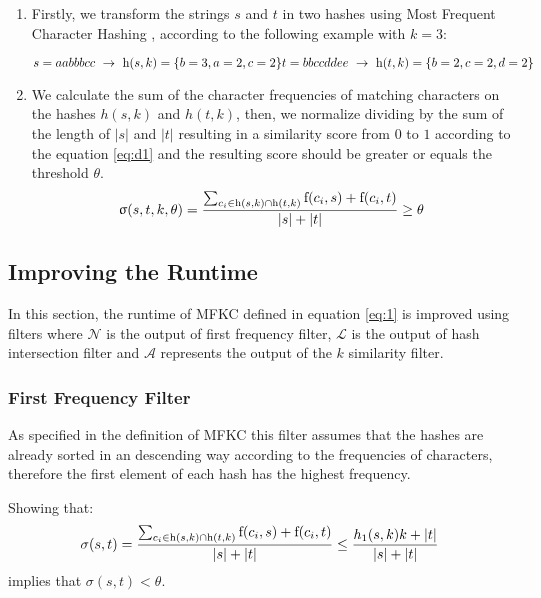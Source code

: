 \begin{enumerate}
	\item Firstly, we transform the strings $s$ and $t$ in two hashes using Most Frequent Character Hashing \cite{seker2014novel}, according to the following example with $k=3$:
	
	$s=aabbbcc \ \rightarrow \ \h{s,k}=\{b=3,a=2,c=2\} \\
	t=bbccddee \ \rightarrow \ \h{t,k}=\{b=2,c=2,d=2\}$
	
	\item We calculate the sum of the character frequencies of matching characters on the hashes $h(s,k)$ and $h(t,k)$, then, we normalize dividing by the sum of the length of $|s|$ and $|t|$ resulting in a similarity score from $0$ to $1$ according to the equation \ref{eq:d1} and the resulting score should be greater or equals the threshold $\theta$.
	\begin{equation} \label{eq:d1}
		\upsigma(s,t,k,\theta) = \frac{\sum_{c_i \in \textnormal{h}(s,k) \cap \textnormal{h}(t,k)} \textnormal{f}(c_i,s)+\textnormal{f}(c_i,t)}{|s|+|t|} \geq \theta
	\end{equation}
	
\end{enumerate}

\subsection{Improving the Runtime}


In this section, the runtime of MFKC defined in equation \ref{eq:1} is improved using filters where $\mathcal{N}$ is the output of first frequency filter, $\mathcal{L}$ is the output of hash intersection filter and $\mathcal{A}$ represents the output of the $k$ similarity filter. 

\subsubsection{First Frequency Filter} \label{fff}

As specified in the definition of MFKC \cite{seker2014novel} this filter assumes that the hashes are already sorted in an descending way according to the frequencies of characters, therefore the first element of each hash has the highest frequency.

\begin{theorem} \label{thr:ff1}
Showing that:
\begin{equation} \label{eq:ff1}
	\sigma(s,t)= \frac
	{\sum_{c_i \in \textnormal{h}(s,k) \cap \textnormal{h}(t,k)} \textnormal{f}(c_i,s)+\textnormal{f}(c_i,t)}
	{|s|+|t|} \leq \frac{h_1(s,k) k + |t|}{|s| + |t|}
\end{equation}
implies that $\sigma(s,t) < \theta$.
\end{theorem}

